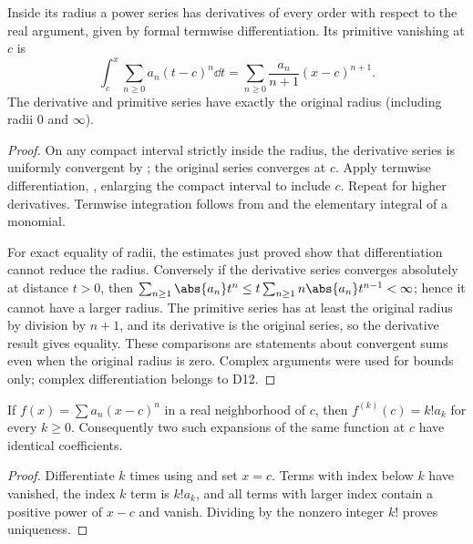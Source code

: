 \begin{theorem}
Inside its radius a power series has derivatives of every order with respect to the real argument, given by formal termwise differentiation. Its primitive vanishing at $c$ is
\[\int_c^x\sum_{n\geq0}a_n(t-c)^n\dd t=\sum_{n\geq0}\frac{a_n}{n+1}(x-c)^{n+1}.\]
The derivative and primitive series have exactly the original radius (including radii $0$ and $\infty$).
\end{theorem}
\begin{proof}
On any compact interval strictly inside the radius, the derivative series is uniformly convergent by ; the original series converges at $c$. Apply termwise differentiation, , enlarging the compact interval to include $c$. Repeat for higher derivatives. Termwise integration follows from  and the elementary integral of a monomial.

For exact equality of radii, the estimates just proved show that differentiation cannot reduce the radius. Conversely if the derivative series converges absolutely at distance $t>0$, then $\sum_{n\geq1}\abs{a_n}t^n\leq t\sum_{n\geq1}n\abs{a_n}t^{n-1}<\infty$; hence it cannot have a larger radius. The primitive series has at least the original radius by division by $n+1$, and its derivative is the original series, so the derivative result gives equality. These comparisons are statements about convergent sums even when the original radius is zero. Complex arguments were used for bounds only; complex differentiation belongs to D12.
\end{proof}

\begin{theorem}
If $f(x)=\sum a_n(x-c)^n$ in a real neighborhood of $c$, then $f^{(k)}(c)=k!a_k$ for every $k\geq0$. Consequently two such expansions of the same function at $c$ have identical coefficients.
\end{theorem}
\begin{proof}
Differentiate $k$ times using  and set $x=c$. Terms with index below $k$ have vanished, the index $k$ term is $k!a_k$, and all terms with larger index contain a positive power of $x-c$ and vanish. Dividing by the nonzero integer $k!$ proves uniqueness.
\end{proof}

